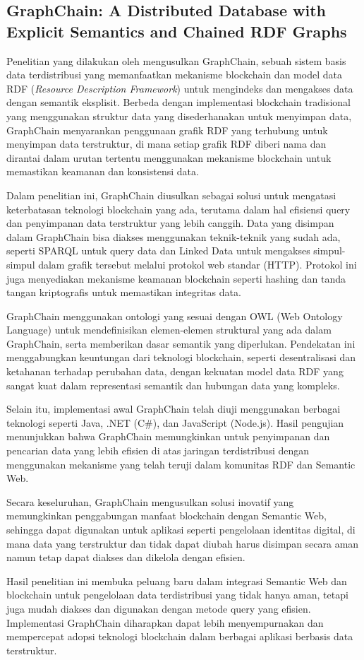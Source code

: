 \subsection{GraphChain: A Distributed Database with Explicit Semantics and Chained RDF Graphs}
\label{subsec:graphchain}

Penelitian yang dilakukan oleh \cite{sopek2018graphchain} mengusulkan GraphChain, sebuah sistem basis data terdistribusi yang memanfaatkan mekanisme blockchain dan model data RDF (\textit{Resource Description Framework}) untuk mengindeks dan mengakses data dengan semantik eksplisit. Berbeda dengan implementasi blockchain tradisional yang menggunakan struktur data yang disederhanakan untuk menyimpan data, GraphChain menyarankan penggunaan grafik RDF yang terhubung untuk menyimpan data terstruktur, di mana setiap grafik RDF diberi nama dan dirantai dalam urutan tertentu menggunakan mekanisme blockchain untuk memastikan keamanan dan konsistensi data.

Dalam penelitian ini, GraphChain diusulkan sebagai solusi untuk mengatasi keterbatasan teknologi blockchain yang ada, terutama dalam hal efisiensi query dan penyimpanan data terstruktur yang lebih canggih. Data yang disimpan dalam GraphChain bisa diakses menggunakan teknik-teknik yang sudah ada, seperti SPARQL untuk query data dan Linked Data untuk mengakses simpul-simpul dalam grafik tersebut melalui protokol web standar (HTTP). Protokol ini juga menyediakan mekanisme keamanan blockchain seperti hashing dan tanda tangan kriptografis untuk memastikan integritas data.

GraphChain menggunakan ontologi yang sesuai dengan OWL (Web Ontology Language) untuk mendefinisikan elemen-elemen struktural yang ada dalam GraphChain, serta memberikan dasar semantik yang diperlukan. Pendekatan ini menggabungkan keuntungan dari teknologi blockchain, seperti desentralisasi dan ketahanan terhadap perubahan data, dengan kekuatan model data RDF yang sangat kuat dalam representasi semantik dan hubungan data yang kompleks.

Selain itu, implementasi awal GraphChain telah diuji menggunakan berbagai teknologi seperti Java, .NET (C\#), dan JavaScript (Node.js). Hasil pengujian menunjukkan bahwa GraphChain memungkinkan untuk penyimpanan dan pencarian data yang lebih efisien di atas jaringan terdistribusi dengan menggunakan mekanisme yang telah teruji dalam komunitas RDF dan Semantic Web.

Secara keseluruhan, GraphChain mengusulkan solusi inovatif yang memungkinkan penggabungan manfaat blockchain dengan Semantic Web, sehingga dapat digunakan untuk aplikasi seperti pengelolaan identitas digital, di mana data yang terstruktur dan tidak dapat diubah harus disimpan secara aman namun tetap dapat diakses dan dikelola dengan efisien.

Hasil penelitian ini membuka peluang baru dalam integrasi Semantic Web dan blockchain untuk pengelolaan data terdistribusi yang tidak hanya aman, tetapi juga mudah diakses dan digunakan dengan metode query yang efisien. Implementasi GraphChain diharapkan dapat lebih menyempurnakan dan mempercepat adopsi teknologi blockchain dalam berbagai aplikasi berbasis data terstruktur.